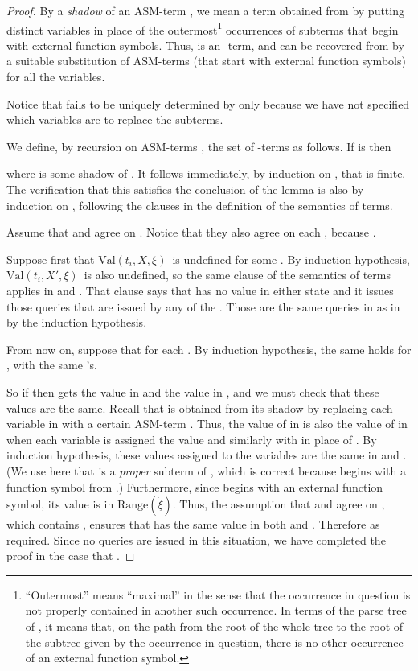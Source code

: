 \documentclass{LMCS}
\theoremstyle{definition}
\newcommand{\ans}{\dot}
\newcommand{\ran}[1]{\ensuremath{{\text{Range}}(#1)}}
\newcommand{\val}[3]{\ensuremath{\text{Val}(#1,#2,#3)}}
\begin{document}
\begin{proof}
By a \emph{shadow} of an ASM-term , we mean a term 
obtained from  by putting distinct variables in place of the
outermost\footnote{``Outermost'' means ``maximal'' in the sense that
the occurrence in question is not properly contained in another such
occurrence.  In terms of the parse tree of , it means that, on the
path from the root of the whole tree to the root of the subtree given
by the occurrence in question, there is no other occurrence of an
external function symbol.} occurrences of subterms that begin
with external function symbols.  Thus,  is an
-term, and  can be recovered from  by a
suitable substitution of ASM-terms (that start with external function
symbols) for all the variables.

Notice that  fails to be uniquely determined
by  only because we have not specified which variables are to replace
the subterms.

We define, by recursion on ASM-terms , the set  of
-terms as follows.  If  is  then

where  is some shadow of . It follows immediately, by
induction on , that  is finite.  The verification that this
 satisfies the conclusion of the lemma is also by induction on
, following the clauses in the definition of the semantics of
terms.

Assume that  and  agree on .  Notice that
they also agree on each , because .

Suppose first that \val {t_i}X\xi\ is undefined for some .  By
induction hypothesis, \val{t_i}{X'}\xi\ is also undefined, so the same
clause of the semantics of terms applies in  and .  That clause
says that  has no value in either state and it issues those queries
that are issued by any of the .  Those are the same queries in
 as in  by the induction hypothesis.

{}From now on, suppose that  for each .  By
induction hypothesis, the same holds for , with the same 's.

So if  then  gets the value  in
 and the value  in , and we must check
that these values are the same.  Recall that  is obtained from its
shadow  by replacing each variable  in  with a
certain ASM-term .  Thus, the value  of
 in  is also the value of  in  when each variable
 is assigned the value  and similarly with
 in place of .  By induction hypothesis, these values assigned
to the variables are the same in  and .  (We use here that
 is a \emph{proper} subterm of , which is correct
because  begins with a function symbol from .)
Furthermore, since  begins with an external function
symbol, its value is in \ran{\ans\xi}.  Thus, the assumption that
 and  agree on , which contains ,
ensures that  has the same value in both  and .
Therefore  as required.
Since no queries are issued in this situation, we have completed the
proof in the case that .


\end{proof}
\end{document}
